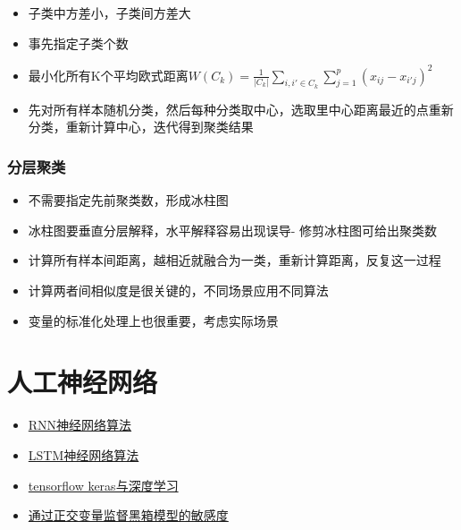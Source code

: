 \documentclass[]{book}
\providecommand{\tightlist}{%
  \setlength{\itemsep}{0pt}\setlength{\parskip}{0pt}}
\begin{document}
\begin{itemize}
\tightlist
\item
  子类中方差小，子类间方差大
\item
  事先指定子类个数
\item
  最小化所有K个平均欧式距离\(W(C_k) = \frac{1}{|C_k|} \sum_{i,i' \in C_k} \sum_{j = 1}^{p} (x_{ij} - x_{i'j})^2\)
\item
  先对所有样本随机分类，然后每种分类取中心，选取里中心距离最近的点重新分类，重新计算中心，迭代得到聚类结果
\end{itemize}

\hypertarget{ux5206ux5c42ux805aux7c7b-1}{%
\subsubsection{分层聚类}\label{ux5206ux5c42ux805aux7c7b-1}}

\begin{itemize}
\tightlist
\item
  不需要指定先前聚类数，形成冰柱图
\item
  冰柱图要垂直分层解释，水平解释容易出现误导- 修剪冰柱图可给出聚类数
\item
  计算所有样本间距离，越相近就融合为一类，重新计算距离，反复这一过程
\item
  计算两者间相似度是很关键的，不同场景应用不同算法
\item
  变量的标准化处理上也很重要，考虑实际场景
\end{itemize}

\hypertarget{ux4ebaux5de5ux795eux7ecfux7f51ux7edc}{%
\section{人工神经网络}\label{ux4ebaux5de5ux795eux7ecfux7f51ux7edc}}

\begin{itemize}
\tightlist
\item
  \href{http://karpathy.github.io/2015/05/21/rnn-effectiveness/}{RNN神经网络算法}
\item
  \href{http://livefreeordichotomize.com/2017/11/08/lstm-neural-nets-as-told-by-baseball/}{LSTM神经网络算法}
\item
  \href{https://rstd.io/ml-with-tensorflow-and-r/}{tensorflow keras与深度学习}
\item
  \href{http://blog.fastforwardlabs.com/2017/03/09/fairml-auditing-black-box-predictive-models.html}{通过正交变量监督黑箱模型的敏感度}
\end{itemize}
\end{document}
